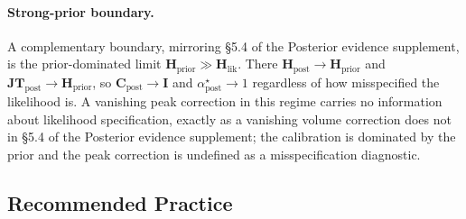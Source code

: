 \documentclass[11pt]{article}
\begin{document}
\paragraph{Strong-prior boundary.}
A complementary boundary, mirroring \S5.4 of the Posterior evidence supplement, is the prior-dominated limit $\mathbf H_{\mathrm{prior}} \gg \mathbf H_{\mathrm{lik}}$. There $\mathbf H_{\mathrm{post}} \to \mathbf H_{\mathrm{prior}}$ and $\mathbf{JT}_{\mathrm{post}} \to \mathbf H_{\mathrm{prior}}$, so $\mathbf C_{\mathrm{post}} \to \mathbf I$ and $\alpha^\star_{\mathrm{post}} \to 1$ regardless of how misspecified the likelihood is. A vanishing peak correction in this regime carries no information about likelihood specification, exactly as a vanishing volume correction does not in \S5.4 of the Posterior evidence supplement; the calibration is dominated by the prior and the peak correction is undefined as a misspecification diagnostic.

\subsection{Recommended Practice}
\label{sec:practice-lik}
\end{document}
